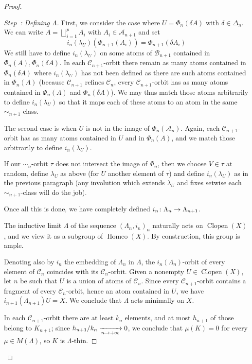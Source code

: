 \documentclass[AHL,Unicode]{cedram}
\DeclareMathOperator{\Homeo}{Homeo}
\DeclareMathOperator{\Clopen}{Clopen}
\newcommand{\mcA}{\mathcal{A}}
\newcommand{\mcB}{\mathcal{B}}
\newcommand{\mcC}{\mathcal{C}}
\newcounter{setofstep}
\newcounter{step}[setofstep]
\newenvironment{step}[1][]{\refstepcounter{step}\begin{proof}[{Step~\thestep\if#1\empty\else: #1\fi}]}{\let\qed\relax\end{proof}}
\renewcommand*{\to}{\mathchoice{\longrightarrow}{\rightarrow}{\rightarrow}{\rightarrow}}
\begin{document}
\begin{proof}
\begin{step}[{Defining $\Lambda$}]
First, we consider the case where $U=\Phi_n(\delta A)$ with $\delta \in \Delta_n$. We can write $A=\bigsqcup_{i=1}^p A_i$ with $A_i \in \mcA_{n+1}$ and set
\[
i_n(\lambda_U)(\Phi_{n+1}(A_i))=\Phi_{n+1}(\delta A_i)
\]
We still have to define $i_n(\lambda_U)$ on some atoms of $\mcB_{n+1}$ contained in $\Phi_n(A),\Phi_n(\delta A)$. In each $\mcC_{n+1}$-orbit there remain as many atoms contained in $\Phi_n(\delta A)$ where $i_n(\lambda_U)$ has not been defined as there are such atoms contained in $\Phi_n(A)$ (because $\mcC_{n+1}$ refines $\mcC_n$, every $\mcC_{n+1}$-orbit has as many atoms contained in $\Phi_n(A)$ and $\Phi_n(\delta A)$). We may thus match those atoms arbitrarily to define $i_n(\lambda_U)$ so that it maps each of these atoms to an atom in the same $\sim_{n+1}$-class.

The second case is when $U$ is not in the image of $\Phi_n(\mcA_n)$. Again, each $\mcC_{n+1}$-orbit has as many atoms contained in $U$ and in $\Phi_n(A)$, and we match those arbitrarily to define $i_n(\lambda_U)$.

If our $\sim_n$-orbit $\tau$ does not intersect the image of $\Phi_n$, then we choose $V \in \tau$ at random, define $\lambda_U$ as above (for $U$ another element of $\tau$) and define $i_n(\lambda_U)$ as in the previous paragraph (any involution which extends $\lambda_U$ and fixes setwise each $\sim_{n+1}$-class will do the job).

Once all this is done, we have completely defined $i_n \colon \Lambda_n \to \Lambda_{n+1}$.

The inductive limit $\Lambda$ of the sequence $(\Lambda_n,i_n)_n$ naturally acts on $\Clopen(X)$, and we view it as a subgroup of $\Homeo(X)$. By construction, this group is ample.

Denoting also by $i_n$ the embedding of $\Lambda_n$ in $\Lambda$, the $i_n(\Lambda_n)$-orbit of every element of $\mcC_{n}$ coincides with its $\mcC_{n}$-orbit. Given a nonempty $U \in \Clopen(X)$, let $n$ be such that $U $ is a union of atoms of $\mcC_n$. Since every $\mcC_{n+1}$-orbit contains a fragment of every $\mcC_n$-orbit, hence an atom contained in $U$, we have $i_{n+1}(\Lambda_{n+1})U=X$. We conclude that $\Lambda$ acts minimally on $X$.

In each $\mcC_{n+1}$-orbit there are at least $k_n$ elements, and at most $h_{n+1}$ of those belong to $K_{n+1}$; since $h_{n+1}/k_n \xrightarrow[n \to + \infty]{} 0$, we conclude that $\mu(K)=0$ for every $\mu \in M(\Lambda)$, so $K$ is $\Lambda$-thin.


\end{step}
\end{proof}
\end{document}
